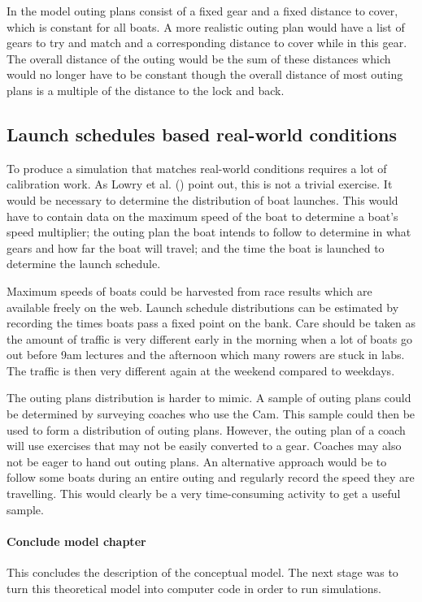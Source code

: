 In the model outing plans consist of a fixed gear and a fixed distance to cover, which is constant for all boats. A more realistic outing plan would have a list of gears to try and match and a corresponding distance to cover while in this gear. The overall distance of the outing would be the sum of these distances which would no longer have to be constant though the overall distance of most outing plans is a multiple of the distance to the lock and back.

\subsection{Launch schedules based real-world conditions}\label{model:future:launch_schedule}

To produce a simulation that matches real-world conditions requires a lot of calibration work. As Lowry et al. (\cite{Lowry2011}) point out, this is not a trivial exercise. It would be necessary to determine the distribution of boat launches. This would have to contain data on the maximum speed of the boat to determine a boat's speed multiplier; the outing plan the boat intends to follow to determine in what gears and how far the boat will travel; and the time the boat is launched to determine the launch schedule.

Maximum speeds of boats could be harvested from race results which are available freely on the web. Launch schedule distributions can be estimated by recording the times boats pass a fixed point on the bank. Care should be taken as the amount of traffic is very different early in the morning when a lot of boats go out before 9am lectures and the afternoon which many rowers are stuck in labs. The traffic is then very different again at the weekend compared to weekdays.

The outing plans distribution is harder to mimic. A sample of outing plans could be determined by surveying coaches who use the Cam. This sample could then be used to form a distribution of outing plans. However, the outing plan of a coach will use exercises that may not be easily converted to a gear. Coaches may also not be eager to hand out outing plans. An alternative approach would be to follow some boats during an entire outing and regularly record the speed they are travelling. This would clearly be a very time-consuming activity to get a useful sample.

\paragraph{Conclude model chapter}
This concludes the description of the conceptual model. The next stage was to turn this theoretical model into computer code in order to run simulations.
